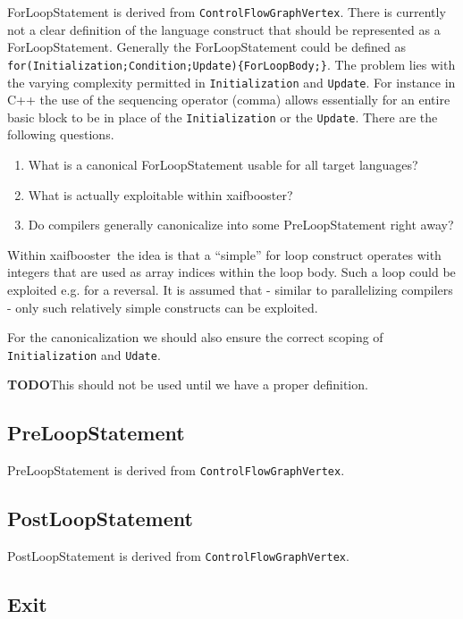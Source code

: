 \documentclass{book}
\newcommand{\todo}{{\bf TODO}}
\newcommand{\xaifbooster}{xaifbooster}
\newcommand{\ControlFlowGraphVertex}{{\tt ControlFlowGraphVertex}}
\begin{document}
ForLoopStatement is derived from \ControlFlowGraphVertex.
There is currently not a clear definition of 
the language construct that should be represented 
as a ForLoopStatement. Generally the ForLoopStatement 
could be defined as {\tt for(Initialization;Condition;Update)\{ForLoopBody;\}}.
The problem lies with the varying complexity permitted in 
{\tt Initialization} and {\tt Update}. For instance in 
C++ the use of the sequencing operator (comma) allows essentially 
for an entire basic block to be in place of the {\tt Initialization} 
or the {\tt Update}. 
There are the following questions. 
\begin{enumerate}
\item What is a canonical ForLoopStatement usable for all target languages?
\item What is actually exploitable within \xaifbooster?
\item Do compilers generally canonicalize into some PreLoopStatement 
right away?
\end{enumerate}
Within \xaifbooster\ the idea is that a ``simple'' for loop 
construct operates with integers that are used as array indices within
the loop body. Such a loop could be exploited e.g. for a reversal. 
It is assumed that - similar to parallelizing compilers - only such 
relatively simple constructs can be exploited. 

For the canonicalization we should also ensure the correct scoping of 
{\tt Initialization} and {\tt Udate}.

\todo This should not be used until we have a proper definition.

\subsection{PreLoopStatement}
\label{ssec:PreLoopStatement}

PreLoopStatement is derived from \ControlFlowGraphVertex.

\subsection{PostLoopStatement}
\label{ssec:PostLoopStatement}

PostLoopStatement is derived from \ControlFlowGraphVertex.

\subsection{Exit}
\label{ssec:Exit}
\end{document}
